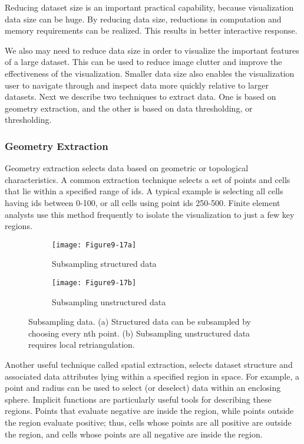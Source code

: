 Reducing dataset size is an important practical capability, because visualization data size can be huge. By reducing data size, reductions in computation and memory requirements can be realized. This results in better interactive response.

We also may need to reduce data size in order to visualize the important features of a large dataset. This can be used to reduce image clutter and improve the effectiveness of the visualization. Smaller data size also enables the visualization user to navigate through and inspect data more quickly relative to larger datasets. Next we describe two techniques to extract data. One is based on geometry extraction, and the other is based on data thresholding, or thresholding.

\subsubsection{Geometry Extraction}

Geometry extraction selects data based on geometric or topological characteristics. A common extraction technique selects a set of points and cells that lie within a specified range of ids. A typical example is selecting all cells having ids between 0-100, or all cells using point ids 250-500. Finite element analysts use this method frequently to isolate the visualization to just a few key regions.

\begin{figure}[htb]
	\begin{subfigure}[h]{0.48\linewidth}
		\texttt{[image: Figure9-17a]}
		\captionsetup{justification=centering}
		\caption{Subsampling structured data}
		\label{fig:Figure9-17a}
	\end{subfigure}
	\hfill
	\begin{subfigure}[h]{0.48\linewidth}
		\texttt{[image: Figure9-17b]}
		\captionsetup{justification=centering}
		\caption{Subsampling unstructured data}
		\label{fig:Figure9-17b}
	\end{subfigure}
	\caption{Subsampling data. (a) Structured data can be subsampled by choosing every nth point. (b) Subsampling unstructured data requires local retriangulation.}\label{fig:Figure9-17}
\end{figure}

Another useful technique called spatial extraction, selects dataset structure and associated data attributes lying within a specified region in space. For example, a point and radius can be used to select (or deselect) data within an enclosing sphere. Implicit functions are particularly useful tools for describing these regions. Points that evaluate negative are inside the region, while points outside the region evaluate positive; thus, cells whose points are all positive are outside the region, and cells whose points are all negative are inside the region.

